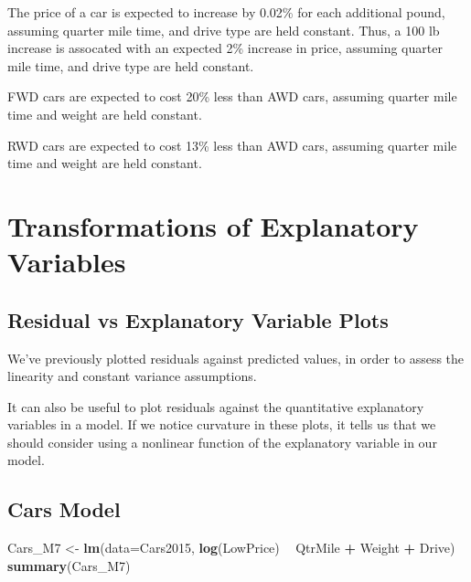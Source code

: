 \documentclass[]{book}
\newenvironment{Shaded}{\begin{snugshade}}{\end{snugshade}}
\newcommand{\KeywordTok}[1]{\textcolor[rgb]{0.13,0.29,0.53}{\textbf{#1}}}
\newcommand{\DataTypeTok}[1]{\textcolor[rgb]{0.13,0.29,0.53}{#1}}
\newcommand{\StringTok}[1]{\textcolor[rgb]{0.31,0.60,0.02}{#1}}
\newcommand{\OperatorTok}[1]{\textcolor[rgb]{0.81,0.36,0.00}{\textbf{#1}}}
\newcommand{\NormalTok}[1]{#1}
\begin{document}
The price of a car is expected to increase by 0.02\% for each additional
pound, assuming quarter mile time, and drive type are held constant.
Thus, a 100 lb increase is assocated with an expected 2\% increase in
price, assuming quarter mile time, and drive type are held constant.

FWD cars are expected to cost 20\% less than AWD cars, assuming quarter
mile time and weight are held constant.

RWD cars are expected to cost 13\% less than AWD cars, assuming quarter
mile time and weight are held constant.

\section{Transformations of Explanatory
Variables}\label{transformations-of-explanatory-variables}

\subsection{Residual vs Explanatory Variable
Plots}\label{residual-vs-explanatory-variable-plots}

We've previously plotted residuals against predicted values, in order to
assess the linearity and constant variance assumptions.

It can also be useful to plot residuals against the quantitative
explanatory variables in a model. If we notice curvature in these plots,
it tells us that we should consider using a nonlinear function of the
explanatory variable in our model.

\subsection{Cars Model}\label{cars-model}

\begin{Shaded}
\begin{Highlighting}[]
\NormalTok{Cars_M7 <-}\StringTok{ }\KeywordTok{lm}\NormalTok{(}\DataTypeTok{data=}\NormalTok{Cars2015, }\KeywordTok{log}\NormalTok{(LowPrice) }\OperatorTok{~}\StringTok{ }\NormalTok{QtrMile }\OperatorTok{+}\StringTok{ }\NormalTok{Weight }\OperatorTok{+}\StringTok{ }\NormalTok{Drive)}
\KeywordTok{summary}\NormalTok{(Cars_M7)}
\end{Highlighting}
\end{Shaded}
\end{document}
